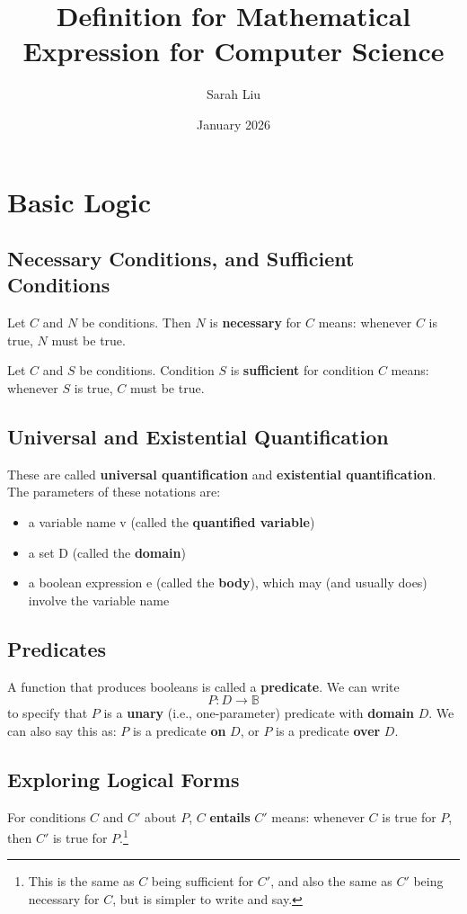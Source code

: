 \documentclass{article}
\title{Definition for Mathematical Expression for Computer Science}
\author{Sarah Liu}
\date{January 2026}
\begin{document}
\maketitle

\section{Basic Logic}
\subsection{Necessary Conditions, and Sufficient Conditions}
Let $C$ and $N$ be conditions. Then $N$ is \textbf{necessary} for $C$ means: whenever $C$ is true, $N$ must be true.

Let $C$ and $S$ be conditions. Condition $S$ is \textbf{sufficient} for condition $C$ means: whenever $S$ is true, $C$ must be true.


\subsection{Universal and Existential Quantification}

These are called \textbf{universal quantification} and \textbf{existential quantification}.
The parameters of these notations are:
\begin{itemize}
    \item a variable name v (called the \textbf{quantified variable})
    \item a set D (called the \textbf{domain})
    \item a boolean expression e (called the \textbf{body}), which may (and usually does) involve the variable name
\end{itemize}


\subsection{Predicates}

A function that produces booleans is called a \textbf{predicate}. We can write
\[
P:D\rightarrow\mathbb{B}
\]
to specify that $P$ is a \textbf{unary} (i.e., one-parameter) predicate with \textbf{domain} $D$. We can also say this as: $P$ is a predicate \textbf{on} $D$, or $P$ is a predicate \textbf{over} $D$.


\subsection{Exploring Logical Forms}
For conditions $C$ and $C'$ about $P$, $C$ \textbf{entails} $C'$ means: whenever $C$ is true for $P$, then $C'$ is true for $P$.\footnote{This is the same as $C$ being sufficient for $C'$, and also the same as $C'$ being necessary for $C$, but is simpler to write and say.}
\end{document}
